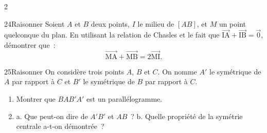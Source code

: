 \documentclass[10pt,a4paper]{article}
\newcommand{\starfull}[1]{{\color{#1}\ding{72}}}
\newcommand{\starempty}{{\color{gray!45}\ding{73}}}
\newcommand{\Vj}[1]{\overrightarrow{\text{#1}}}
\begin{document}
\begin{multicols}{2}
\begin{Exo}{24}{\starfull{diffblue}\starfull{diffblue}\starempty}{Raisonner}
Soient $A$ et $B$ deux points, $I$ le milieu de $[AB]$, et $M$ un point quelconque du plan.
En utilisant la relation de Chasles et le fait que $\Vj{IA}+\Vj{IB}=\vec 0$, d\'emontrer que~:
$$\Vj{MA}+\Vj{MB}=2\Vj{MI}.$$
\end{Exo}

\par\vspace{4pt}

\begin{Exo}{25}{\starfull{diffred}\starfull{diffred}\starfull{diffred}}{Raisonner}
On consid\`ere trois points $A$, $B$ et $C$. On nomme $A'$ le sym\'etrique de $A$ par rapport \`a $C$ et $B'$ le sym\'etrique de $B$ par rapport \`a $C$.
\begin{enumerate}
\item Montrer que $BAB'A'$ est un parall\'elogramme.
\item a. Que peut-on dire de $A'B'$ et $AB$~? \quad b. Quelle propri\'et\'e de la sym\'etrie centrale a-t-on d\'emontr\'ee~?
\end{enumerate}
\end{Exo}

\end{multicols}
\end{document}
